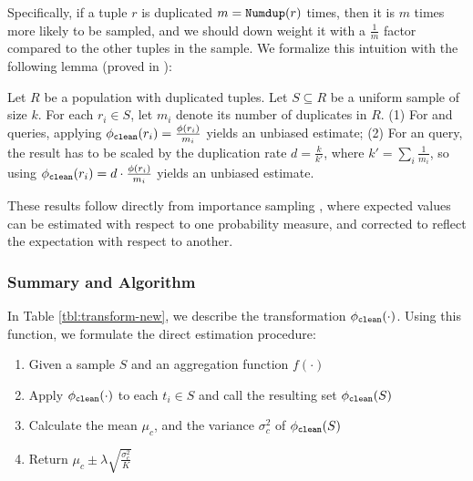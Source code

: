 Specifically, if a tuple $r$ is duplicated $m=\Dedup{r}{R}$ times, then it is $m$ times more likely to be sampled, and we should down weight it with a $\frac{1}{m}$ factor compared to the other tuples in the sample.
We formalize this intuition with the following lemma (proved in \cite{wang1999sample}):
\begin{lemma}\label{lem:derror}
Let $R$ be a population with duplicated tuples. %
Let $S \subseteq R$ be a uniform sample of size $k$.
For each $r_{i}\in S$, let $m_i$ denote its number of duplicates in $R$.
 (1) For \sumfunc and \countfunc queries, applying $\saqpplusfunc(r_i)=\frac{\saqpfunc(r_i)}{m_i}$ yields an unbiased estimate;
(2) For an \avgfunc query, the result has to be scaled by the duplication rate $d=\frac{k}{k'}$,
where $k'=\sum_i\frac{1}{m_i}$, so using $\saqpplusfunc(r_i)=d\cdot\frac{\saqpfunc(r_i)}{m_i}$ yields an unbiased estimate.
\end{lemma}

These results follow directly from importance sampling \cite{liu1996metropolized}, where expected values can be estimated with respect to one probability measure, and corrected to reflect the expectation with respect to another.

\subsubsection{Summary and Algorithm}
In Table \ref{tbl:transform-new}, we describe the transformation $\saqpplusfunc(\cdot)$.
Using this function, we formulate the direct estimation procedure:

\begin{enumerate}
\item Given a sample $S$ and an aggregation function $f(\cdot)$\vspace{-.5em}
\item Apply $\saqpplusfunc(\cdot)$ to each $t_i \in S$ and call the resulting set $\saqpplusfunc(S)$\vspace{-.5em}
\item Calculate the mean $\mu_c$, and the variance $\sigma_c^2$ of $\saqpplusfunc(S)$\vspace{-.5em}
\item Return $\mu_c \pm \lambda \sqrt{\frac{\sigma_c^2}{K}}$\vspace{-.5em}
\end{enumerate}


